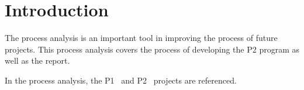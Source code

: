\section{Introduction}\label{sec:introduction}

The process analysis is an important tool in improving the process of future projects.
This process analysis covers the process of developing the P2 program as well as the report.

In the process analysis, the P1~\cite{P1} and P2~\cite{P2} projects are referenced.
